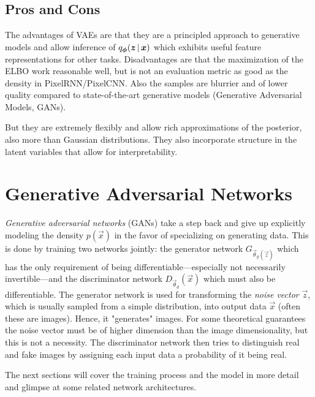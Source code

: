 		\subsection{Pros and Cons}
			The advantages of VAEs are that they are a principled approach to generative models and allow inference of \( q_{\bm{\phi}}(\bm{z} \,\vert\, \bm{x}) \) which exhibits useful feature representations for other tasks. Disadvantages are that the maximization of the ELBO work reasonable well, but is not an evaluation metric as good as the density in PixelRNN/PixelCNN. Also the samples are blurrier and of lower quality compared to state-of-the-art generative models (Generative Adversarial Models, GANs).

			But they are extremely flexibly and allow rich approximations of the posterior, also more than Gaussian distributions. They also incorporate structure in the latent variables that allow for interpretability.

	\section{Generative Adversarial Networks}
		\emph{Generative adversarial networks} (GANs) take a step back and give up explicitly modeling the density \( p(\vec{x}) \) in the favor of specializing on generating data. This is done by training two networks jointly: the generator network \( G_{\vec{\theta}_g(\vec{z})} \) which has the only requirement of being differentiable---especially not necessarily invertible---and the discriminator network \( D_{\vec{\theta}_d}(\vec{x}) \) which must also be differentiable. The generator network is used for transforming the \emph{noise vector} \(\vec{z}\), which is usually sampled from a simple distribution, into output data \(\vec{x}\) (often these are images). Hence, it "generates" images. For some theoretical guarantees the noise vector must be of higher dimension than the image dimensionality, but this is not a necessity. The discriminator network then tries to distinguish real and fake images by assigning each input data a probability of it being real.

		The next sections will cover the training process and the model in more detail and glimpse at some related network architectures.

